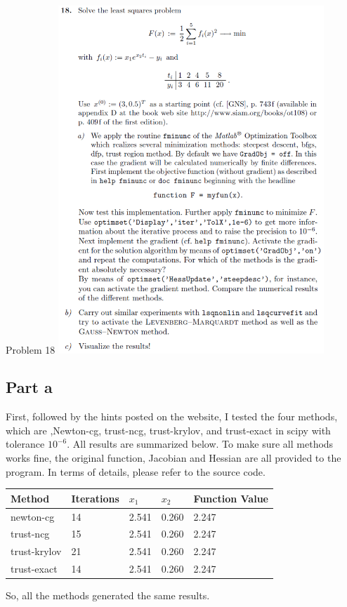 \documentclass[10pt]{article}
\begin{document}
\begin{section}{Problem 18}
	\includegraphics[width=10cm]{img/problem18.png}
	\subsection{Part a}
	First, followed by the hints posted on the website, I tested the four methods, which are ,Newton-cg, trust-ncg, trust-krylov, and trust-exact in scipy with tolerance $10^{-6}$. All results are summarized below. To make sure all methods works fine, the original function, Jacobian and Hessian are all provided to the program. In terms of details, please refer to the source code. 

    	\begin{tabular}{lllll}
    		\hline
    		Method &Iterations & $x_1$ & $x_2$& Function Value \\
    		\hline\hline
			newton-cg  & 14  & 2.541  & 0.260& 2.247    \\
			trust-ncg       & 15   & 2.541  & 0.260 & 2.247    \\
			trust-krylov    & 21   & 2.541  & 0.260 & 2.247 \\
			trust-exact     & 14  & 2.541  & 0.260 & 2.247
    	 \end{tabular}
     
    So, all the methods generated the same results.  

\end{section}
\end{document}
